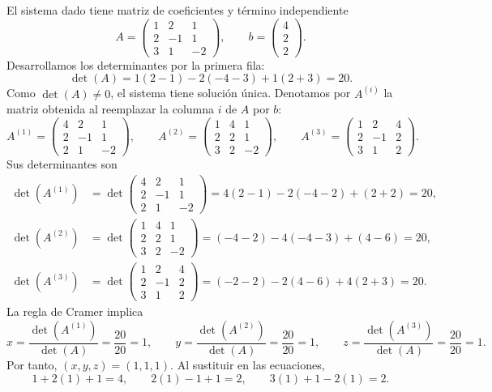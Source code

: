 \documentclass[10pt,a4]{examenEPN0}
\begin{document}
El sistema dado tiene matriz de coeficientes y término independiente
\[
    A=\begin{pmatrix}1&2&1\\2&-1&1\\3&1&-2\end{pmatrix},
    \qquad b=\begin{pmatrix}4\\2\\2\end{pmatrix}.
\]
Desarrollamos los determinantes por la primera fila:
\[
    \det(A)
    =1(2-1)-2(-4-3)+1(2+3)=20.
\]
Como $\det(A)\ne0$, el sistema tiene solución única. Denotamos por
$A^{(i)}$ la matriz obtenida al reemplazar la columna $i$ de $A$ por $b$:
\[
    A^{(1)}=\begin{pmatrix}4&2&1\\2&-1&1\\2&1&-2\end{pmatrix},\qquad
    A^{(2)}=\begin{pmatrix}1&4&1\\2&2&1\\3&2&-2\end{pmatrix},\qquad
    A^{(3)}=\begin{pmatrix}1&2&4\\2&-1&2\\3&1&2\end{pmatrix}.
\]
Sus determinantes son
\begin{align*}
    \det(A^{(1)})&=\det\begin{pmatrix}4&2&1\\2&-1&1\\2&1&-2\end{pmatrix}
        =4(2-1)-2(-4-2)+(2+2)=20,\\[2mm]
    \det(A^{(2)})&=\det\begin{pmatrix}1&4&1\\2&2&1\\3&2&-2\end{pmatrix}
        =(-4-2)-4(-4-3)+(4-6)=20,\\[2mm]
    \det(A^{(3)})&=\det\begin{pmatrix}1&2&4\\2&-1&2\\3&1&2\end{pmatrix}
        =(-2-2)-2(4-6)+4(2+3)=20.
\end{align*}
La regla de Cramer implica
\[
    x=\frac{\det(A^{(1)})}{\det(A)}=\frac{20}{20}=1,\qquad
    y=\frac{\det(A^{(2)})}{\det(A)}=\frac{20}{20}=1,\qquad
    z=\frac{\det(A^{(3)})}{\det(A)}=\frac{20}{20}=1.
\]
Por tanto, $\boxed{(x,y,z)=(1,1,1)}$. Al sustituir en las ecuaciones,
\[
    1+2(1)+1=4,\qquad 2(1)-1+1=2,\qquad 3(1)+1-2(1)=2.
\]
\end{document}
